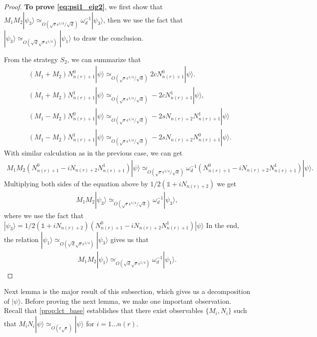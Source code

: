 \documentclass[11pt,letterpaper]{article}
\newcommand{\ket}[1]{|#1\rangle}
\newcommand{\1}{\mathbb{1}}
\newcommand{\nr}{n(r)}
\newcommand{\se}{\sqrt{\epsilon}}
\newcommand{\qe}{\epsilon^{1/4}}
\newcommand{\sd}{\sqrt{d}}
\newcommand{\sr}{\sqrt{r}}
\newcommand{\appd}[1]{\simeq_{#1}}
\theoremstyle{definition}
\begin{document}
\begin{proof}
	\textbf{To prove \cref{eq:psi1_eig2}},
	we first show that $M_1M_2 \ket{\psi_3}\appd{O(\sr \qe/\sd)} \omega_d^{-1} \ket{\psi_3}$, then we 
	use the fact that $\ket{\psi_3} \appd{O(\sd \sr\qe)} \ket{\psi_1}$ to draw the conclusion.
	
	From the strategy $S_2$, we can summarize that 
	\begin{align}
		&(M_1+M_2) N_{\nr+1}^0 \ket{\psi} \appd{O(\sr \qe/\sd)} 2c N_{\nr+1}^0 \ket{\psi}.\\
		&(M_1+M_2) N_{\nr+1}^1 \ket{\psi}  \appd{O(\sr \qe/\sd)} -2cN_{\nr+1}^1 \ket{\psi},\\
		&(M_1-M_2) N_{\nr+1}^0\ket{\psi} \appd{O(\sr\qe/\sd)}-2sN_{\nr+2} N_{\nr+1}^1\ket{\psi}\\
		&(M_1 -M_2)N_{\nr+1}^1 \ket{\psi} \appd{O(\sr\qe/\sd)} -2sN_{\nr+2} N_{\nr+1}^0 \ket{\psi}.
	\end{align}
	With similar calculation as in the previous case, we can get 
	\begin{align}
		M_1M_2 (N_{\nr+1}^0 - i N_{\nr+2}N_{\nr+1}^1) \ket{\psi} \appd{O(\sr \qe/\sd)} 
		\omega_d^{-1} (N_{\nr+1}^0 - i N_{\nr+2}N_{\nr+1}^1)\ket{\psi} .
	\end{align}
	Multiplying both sides of the equation above by $1/2(\1+iN_{\nr+2})$ we get
	\begin{align}
		M_1M_2 \ket{\psi_3} \appd{O(\sr \qe/\sd)} \omega_d^{-1}\ket{\psi_3},
	\end{align}
	where we use the fact that $\ket{\psi_3} = 1/2(\1+iN_{\nr+2})(N_{\nr+1}^0 - i N_{\nr+2}N_{\nr+1}^1) \ket{\psi}$
	In the end, the relation $\ket{\psi_1}  \appd{O(\sd \sr\qe)} \ket{\psi_3}$ gives us that 
	\begin{align}
		M_1M_2 \ket{\psi_1} \appd{O(\sd \sr \qe)} \omega_d^{-1}\ket{\psi_1}.
	\end{align}
\end{proof}
Next lemma is the major result of this subsection, which gives us a decomposition of $\ket{\psi}$.
Before proving the next lemma, we make one important observation.
Recall that \cref{prop:lct_base} establishes that there exist observables $\{M_i, N_i\}$ such that 
$M_iN_i \ket{\psi} \appd{O(r\se)} \ket{\psi}$ for $i = 1 \dots \nr$.
\end{document}
